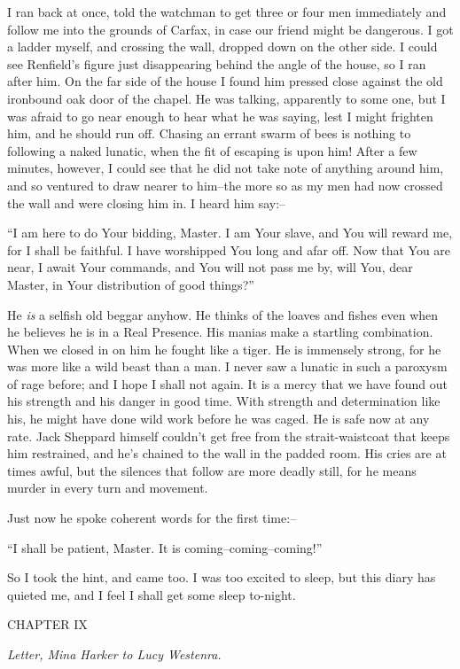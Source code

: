 \documentclass[12pt,openright]{book}
\begin{document}
I ran back at once, told the watchman to get three or four men immediately and follow me into the grounds of Carfax, in case our friend might be dangerous. I got a ladder myself, and crossing the wall, dropped down on the other side. I could see Renfield’s figure just disappearing behind the angle of the house, so I ran after him. On the far side of the house I found him pressed close against the old ironbound oak door of the chapel. He was talking, apparently to some one, but I was afraid to go near enough to hear what he was saying, lest I might frighten him, and he should run off. Chasing an errant swarm of bees is nothing to following a naked lunatic, when the fit of escaping is upon him! After a few minutes, however, I could see that he did not take note of anything around him, and so ventured to draw nearer to him–the more so as my men had now crossed the wall and were closing him in. I heard him say:–

“I am here to do Your bidding, Master. I am Your slave, and You will reward me, for I shall be faithful. I have worshipped You long and afar off. Now that You are near, I await Your commands, and You will not pass me by, will You, dear Master, in Your distribution of good things?”

He \textit{is} a selfish old beggar anyhow. He thinks of the loaves and fishes even when he believes he is in a Real Presence. His manias make a startling combination. When we closed in on him he fought like a tiger. He is immensely strong, for he was more like a wild beast than a man. I never saw a lunatic in such a paroxysm of rage before; and I hope I shall not again. It is a mercy that we have found out his strength and his danger in good time. With strength and determination like his, he might have done wild work before he was caged. He is safe now at any rate. Jack Sheppard himself couldn’t get free from the strait-waistcoat that keeps him restrained, and he’s chained to the wall in the padded room. His cries are at times awful, but the silences that follow are more deadly still, for he means murder in every turn and movement.

Just now he spoke coherent words for the first time:–

“I shall be patient, Master. It is coming–coming–coming!”

So I took the hint, and came too. I was too excited to sleep, but this diary has quieted me, and I feel I shall get some sleep to-night.

CHAPTER IX

\textit{Letter, Mina Harker to Lucy Westenra.}
\end{document}
